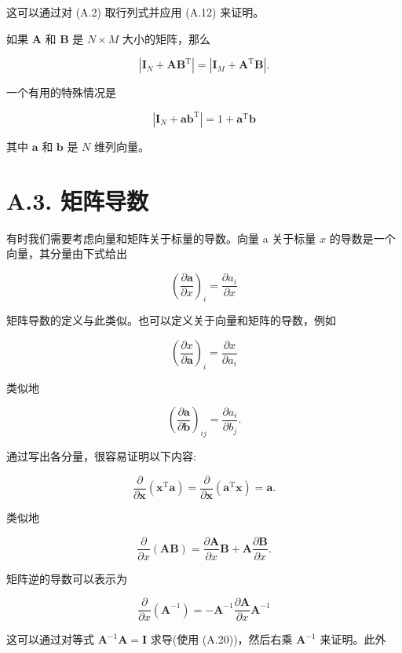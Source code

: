 \documentclass[10pt]{article}
\begin{document}
这可以通过对 (A.2) 取行列式并应用 (A.12) 来证明。

如果 \(\mathbf{A}\) 和 \(\mathbf{B}\) 是 \(N \times  M\) 大小的矩阵，那么

\[
\left| {{\mathbf{I}}_{N} + \mathbf{A}{\mathbf{B}}^{\mathrm{T}}}\right|  = \left| {{\mathbf{I}}_{M} + {\mathbf{A}}^{\mathrm{T}}\mathbf{B}}\right| . \tag{A.14}
\]

一个有用的特殊情况是

\[
\left| {{\mathbf{I}}_{N} + {\mathbf{{ab}}}^{\mathrm{T}}}\right|  = 1 + {\mathbf{a}}^{\mathrm{T}}\mathbf{b} \tag{A.15}
\]

其中 \(\mathbf{a}\) 和 \(\mathbf{b}\) 是 \(N\) 维列向量。

\section*{A.3. 矩阵导数}

有时我们需要考虑向量和矩阵关于标量的导数。向量 a 关于标量 \(x\) 的导数是一个向量，其分量由下式给出

\[
{\left( \frac{\partial \mathbf{a}}{\partial x}\right) }_{i} = \frac{\partial {a}_{i}}{\partial x} \tag{A.16}
\]

矩阵导数的定义与此类似。也可以定义关于向量和矩阵的导数，例如

\[
{\left( \frac{\partial x}{\partial \mathbf{a}}\right) }_{i} = \frac{\partial x}{\partial {a}_{i}} \tag{A.17}
\]

类似地

\[
{\left( \frac{\partial \mathbf{a}}{\partial \mathbf{b}}\right) }_{ij} = \frac{\partial {a}_{i}}{\partial {b}_{j}}. \tag{A.18}
\]

通过写出各分量，很容易证明以下内容:

\[
\frac{\partial }{\partial \mathbf{x}}\left( {{\mathbf{x}}^{\mathrm{T}}\mathbf{a}}\right)  = \frac{\partial }{\partial \mathbf{x}}\left( {{\mathbf{a}}^{\mathrm{T}}\mathbf{x}}\right)  = \mathbf{a}. \tag{A.19}
\]

类似地

\[
\frac{\partial }{\partial x}\left( \mathbf{{AB}}\right)  = \frac{\partial \mathbf{A}}{\partial x}\mathbf{B} + \mathbf{A}\frac{\partial \mathbf{B}}{\partial x}. \tag{A.20}
\]

矩阵逆的导数可以表示为

\[
\frac{\partial }{\partial x}\left( {\mathbf{A}}^{-1}\right)  =  - {\mathbf{A}}^{-1}\frac{\partial \mathbf{A}}{\partial x}{\mathbf{A}}^{-1} \tag{A.21}
\]

这可以通过对等式 \({\mathbf{A}}^{-1}\mathbf{A} = \mathbf{I}\) 求导(使用 (A.20))，然后右乘 \({\mathbf{A}}^{-1}\) 来证明。此外
\end{document}
